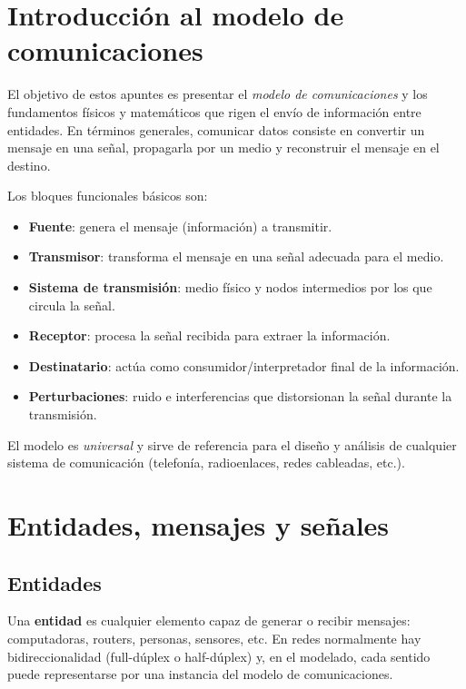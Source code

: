 \documentclass[11pt,a4paper]{article}
\begin{document}
\tableofcontents
\bigskip

\section{Introducción al modelo de comunicaciones}
El objetivo de estos apuntes es presentar el \emph{modelo de comunicaciones} y los fundamentos físicos y matemáticos que rigen el envío de información entre entidades. En términos generales, comunicar datos consiste en convertir un mensaje en una señal, propagarla por un medio y reconstruir el mensaje en el destino. 

Los bloques funcionales básicos son:
\begin{itemize}
  \item \textbf{Fuente}: genera el mensaje (información) a transmitir.
  \item \textbf{Transmisor}: transforma el mensaje en una señal adecuada para el medio.
  \item \textbf{Sistema de transmisión}: medio físico y nodos intermedios por los que circula la señal.
  \item \textbf{Receptor}: procesa la señal recibida para extraer la información.
  \item \textbf{Destinatario}: actúa como consumidor/interpretador final de la información.
  \item \textbf{Perturbaciones}: ruido e interferencias que distorsionan la señal durante la transmisión.
\end{itemize}

El modelo es \emph{universal} y sirve de referencia para el diseño y análisis de cualquier sistema de comunicación (telefonía, radioenlaces, redes cableadas, etc.).

\section{Entidades, mensajes y señales}

\subsection{Entidades}
Una \textbf{entidad} es cualquier elemento capaz de generar o recibir mensajes: computadoras, routers, personas, sensores, etc. En redes normalmente hay bidireccionalidad (full-dúplex o half-dúplex) y, en el modelado, cada sentido puede representarse por una instancia del modelo de comunicaciones.
\end{document}
